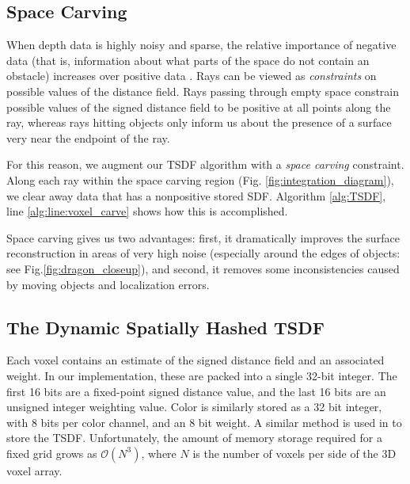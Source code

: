 \documentclass[conference]{IEEEtran}
\newcommand{\figref}[1]{Fig.\ref{#1}}
\begin{document}
\subsection{Space Carving}
\label{section:carving}
When depth data is highly noisy and sparse, the relative importance of negative
data (that is, information about what parts of the space do not contain an
obstacle) increases over positive data \cite{Klingensmith2014}. Rays can be
viewed as \textit{constraints} on possible values of the distance field. Rays
passing through empty space constrain possible values of the signed distance
field to be positive at all points along the ray, whereas rays hitting objects 
only inform us about the presence of a surface very near the endpoint of the ray.

For this reason, we augment our TSDF algorithm with a \textit{space carving}
constraint. Along each ray within the space carving region (Fig.
\ref{fig:integration_diagram}), we clear away data that has a nonpositive stored
SDF. Algorithm \ref{alg:TSDF}, line \ref{alg:line:voxel_carve} shows how this is
accomplished. 

Space carving gives us two advantages: first, it dramatically improves the
surface reconstruction in areas of very high noise (especially around the edges
of objects: see \figref{fig:dragon_closeup}), and second, it removes
some inconsistencies caused by moving objects and localization errors. 
 
\subsection{The Dynamic Spatially Hashed TSDF}
\label{section:spatialhash}
Each voxel contains an estimate of the signed distance field and an
associated weight. In our implementation, these are packed into a single 32-bit
integer. The first 16 bits are a fixed-point signed distance value, and the
last 16 bits  are an unsigned integer weighting value. Color is similarly
stored as a 32 bit integer, with 8 bits per color channel, and an 8 bit weight.
A similar method is used in \cite{Newcombe, Whelan2013, Bylow2013} to store the
TSDF. Unfortunately, the amount of memory storage required for a fixed grid
grows as $\mathcal{O}(N^3)$, where $N$ is the number of voxels per side of the 3D voxel
array. 

\end{document}
